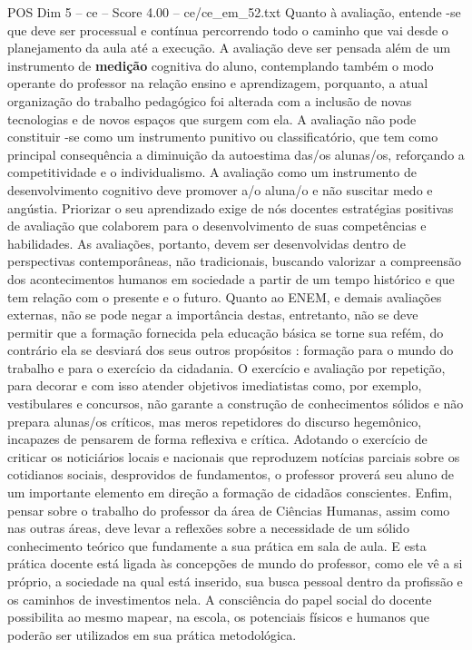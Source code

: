 \begin{textsample}{POS Dim 5 – ce – Score 4.00 – ce/ce\_em\_52.txt}
Quanto à avaliação, entende -se que deve ser processual e contínua percorrendo todo o caminho que vai desde o planejamento da aula até a execução.
A avaliação deve ser pensada além de um instrumento de \textbf{medição} cognitiva do aluno, contemplando também o modo operante do professor na relação ensino e aprendizagem, porquanto, a atual organização do trabalho pedagógico foi alterada com a inclusão de novas tecnologias e de novos espaços que surgem com ela.
A avaliação não pode constituir -se como um instrumento punitivo ou classificatório, que tem como principal consequência a diminuição da autoestima das/os alunas/os, reforçando a competitividade e o individualismo.
A avaliação como um instrumento de desenvolvimento cognitivo deve promover a/o aluna/o e não suscitar medo e angústia.
Priorizar o seu aprendizado exige de nós docentes estratégias positivas de avaliação que colaborem para o desenvolvimento de suas competências e habilidades.
As avaliações, portanto, devem ser desenvolvidas dentro de perspectivas contemporâneas, não tradicionais, buscando valorizar a compreensão dos acontecimentos humanos em sociedade a partir de um tempo histórico e que tem relação com o presente e o futuro.
Quanto ao ENEM, e demais avaliações externas, não se pode negar a importância destas, entretanto, não se deve permitir que a formação fornecida pela educação básica se torne sua refém, do contrário ela se desviará dos seus outros propósitos : formação para o mundo do trabalho e para o exercício da cidadania.
O exercício e avaliação por repetição, para decorar e com isso atender objetivos imediatistas como, por exemplo, vestibulares e concursos, não garante a construção de conhecimentos sólidos e não prepara alunas/os críticos, mas meros repetidores do discurso hegemônico, incapazes de pensarem de forma reflexiva e crítica.
Adotando o exercício de criticar os noticiários locais e nacionais que reproduzem notícias parciais sobre os cotidianos sociais, desprovidos de fundamentos, o professor proverá seu aluno de um importante elemento em direção a formação de cidadãos conscientes.
Enfim, pensar sobre o trabalho do professor da área de Ciências Humanas, assim como nas outras áreas, deve levar a reflexões sobre a necessidade de um sólido conhecimento teórico que fundamente a sua prática em sala de aula.
E esta prática docente está ligada às concepções de mundo do professor, como ele vê a si próprio, a sociedade na qual está inserido, sua busca pessoal dentro da profissão e os caminhos de investimentos nela.
A consciência do papel social do docente possibilita ao mesmo mapear, na escola, os potenciais físicos e humanos que poderão ser utilizados em sua prática metodológica.

\end{textsample}
